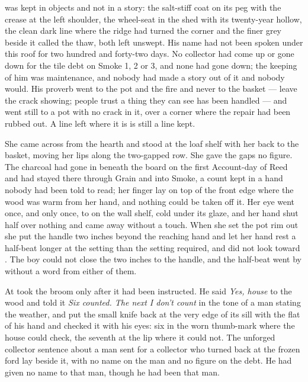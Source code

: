  was kept in objects and not in a story: the salt-stiff coat on its peg with the crease at the left shoulder, the wheel-seat in the shed with its twenty-year hollow, the clean dark line where the  ridge had turned the corner and the finer grey beside it called the thaw, both left unswept. His name had not been spoken under this roof for two hundred and forty-two days. No collector had come up or gone down  for the tile debt on Smoke 1, 2 or 3, and none had gone down; the keeping of him was maintenance, and nobody had made a story out of it and nobody would. His proverb went to the pot and the fire and never to the basket --- leave the crack showing; people trust a thing they can see has been handled --- and went still to a pot with no crack in it, over a corner where the repair had been rubbed out. A line left where it is is still a line kept.

She came across  from the hearth and stood at the loaf shelf with her back to the basket, moving her lips along the two-gapped row. She gave the gaps no figure. The charcoal had gone in beneath the board on the first Account-day of Reed and had stayed there through Grain and into Smoke, a count kept in a hand nobody had been told to read; her finger lay on top of the front edge where the wood was warm from her hand, and nothing could be taken off it. Her eye went once, and only once, to  on the wall shelf, cold under its glaze, and her hand shut half over nothing and came away without a touch. When she set the pot rim out she put the handle two inches beyond the reaching hand and let her hand rest a half-beat longer at the setting than the setting required, and did not look toward . The boy could not close the two inches to the handle, and the half-beat went by without a word from either of them.

\scenebreak

At   took the broom only after it had been instructed. He said \emph{Yes, house} to the wood and told it \emph{Six counted. The next I don't count} in the tone of a man stating the weather, and put the small knife back at the very edge of its sill with the flat of his hand and checked it with his eyes: six in the worn thumb-mark where the house could check, the seventh at the lip where it could not. The unforged collector sentence about a man sent for a collector who turned back at the frozen ford lay beside it, with no name on the man and no figure on the debt. He had given no name to that man, though he had been that man.

